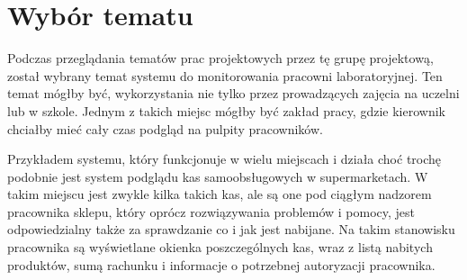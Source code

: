 \section {Wybór tematu}
Podczas przeglądania tematów prac projektowych przez tę grupę projektową, został wybrany temat systemu do monitorowania pracowni laboratoryjnej. Ten temat mógłby być, wykorzystania nie tylko przez prowadzących zajęcia na uczelni lub w szkole. Jednym z takich miejsc mógłby być zakład pracy, gdzie kierownik chciałby mieć cały czas podgląd na pulpity pracowników. 

Przykładem systemu, który funkcjonuje w wielu miejscach i działa choć trochę podobnie jest system podglądu kas samoobsługowych w supermarketach. W takim miejscu jest zwykle kilka takich kas, ale są one pod ciągłym nadzorem pracownika sklepu, który oprócz rozwiązywania problemów i pomocy, jest odpowiedzialny także za sprawdzanie co i jak jest nabijane. Na takim stanowisku pracownika są wyświetlane okienka poszczególnych kas, wraz z listą nabitych produktów, sumą rachunku i informacje o potrzebnej autoryzacji pracownika.